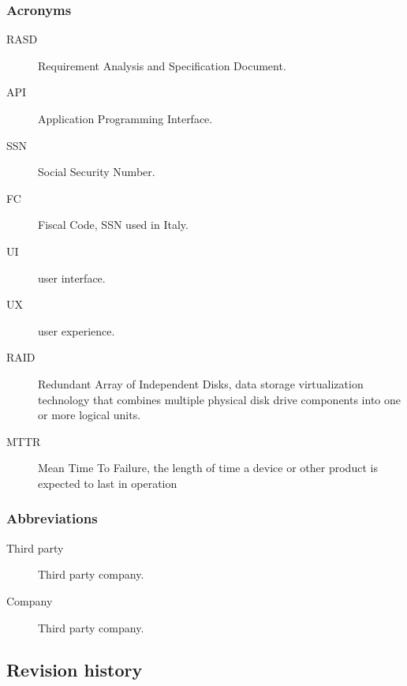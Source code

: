 \documentclass[../main.tex]{subfiles}
\begin{document}
\subsubsection{Acronyms}
\begin{description}

	\item [RASD] Requirement Analysis and Specification Document.
	\item [API] Application Programming Interface.
	\item [SSN] Social Security Number.
	\item [FC] Fiscal Code, SSN used in Italy.
	\item [UI] user interface.
	\item [UX] user experience.
	\item [RAID] Redundant Array of Independent Disks, data storage virtualization technology that combines multiple physical disk drive components into one or more logical units.
	\item [MTTR] Mean Time To Failure, the length of time a device or other product is expected to last in operation

\end{description}

\subsubsection{Abbreviations}
\begin{description}

	\item [Third party] Third party company.
	\item [Company] Third party company.

\end{description}

\subsection{Revision history}
\end{document}
